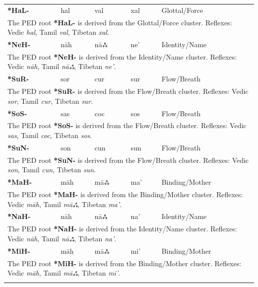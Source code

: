 \begin{longtable}{p{} p{} p{} p{} p{}}
\textbf{*HaL-} & hal & val & xal & Glottal/Force \\ 
\multicolumn{5}{p{\textwidth}}{\small The PED root \textbf{*HaL-} is derived from the Glottal/Force cluster. Reflexes: Vedic \textit{hal}, Tamil \textit{val}, Tibetan \textit{xal}. } \\ \addlinespace 
\textbf{*NeH-} & nāh & nāஃ & ne' & Identity/Name \\ 
\multicolumn{5}{p{\textwidth}}{\small The PED root \textbf{*NeH-} is derived from the Identity/Name cluster. Reflexes: Vedic \textit{nāh}, Tamil \textit{nāஃ}, Tibetan \textit{ne'}. } \\ \addlinespace 
\textbf{*SuR-} & sor & cur & sur & Flow/Breath \\ 
\multicolumn{5}{p{\textwidth}}{\small The PED root \textbf{*SuR-} is derived from the Flow/Breath cluster. Reflexes: Vedic \textit{sor}, Tamil \textit{cur}, Tibetan \textit{sur}. } \\ \addlinespace 
\textbf{*SoS-} & sas & coc & sos & Flow/Breath \\ 
\multicolumn{5}{p{\textwidth}}{\small The PED root \textbf{*SoS-} is derived from the Flow/Breath cluster. Reflexes: Vedic \textit{sas}, Tamil \textit{coc}, Tibetan \textit{sos}. } \\ \addlinespace 
\textbf{*SuN-} & son & cun & sun & Flow/Breath \\ 
\multicolumn{5}{p{\textwidth}}{\small The PED root \textbf{*SuN-} is derived from the Flow/Breath cluster. Reflexes: Vedic \textit{son}, Tamil \textit{cun}, Tibetan \textit{sun}. } \\ \addlinespace 
\textbf{*MaH-} & māh & māஃ & ma' & Binding/Mother \\ 
\multicolumn{5}{p{\textwidth}}{\small The PED root \textbf{*MaH-} is derived from the Binding/Mother cluster. Reflexes: Vedic \textit{māh}, Tamil \textit{māஃ}, Tibetan \textit{ma'}. } \\ \addlinespace 
\textbf{*NaH-} & nāh & nāஃ & na' & Identity/Name \\ 
\multicolumn{5}{p{\textwidth}}{\small The PED root \textbf{*NaH-} is derived from the Identity/Name cluster. Reflexes: Vedic \textit{nāh}, Tamil \textit{nāஃ}, Tibetan \textit{na'}. } \\ \addlinespace 
\textbf{*MiH-} & māh & māஃ & mi' & Binding/Mother \\ 
\multicolumn{5}{p{\textwidth}}{\small The PED root \textbf{*MiH-} is derived from the Binding/Mother cluster. Reflexes: Vedic \textit{māh}, Tamil \textit{māஃ}, Tibetan \textit{mi'}. } \\ \addlinespace 

\end{longtable}
